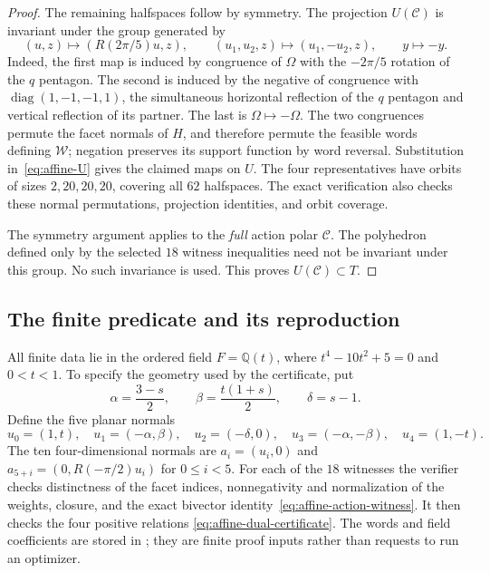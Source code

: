 \begin{proof}
The remaining halfspaces follow by symmetry. The projection
$U(\mathcal C)$ is invariant under the group generated by
\[
 (u,z)\longmapsto(R(2\pi/5)u,z),\qquad
 (u_1,u_2,z)\longmapsto(u_1,-u_2,z),\qquad
 y\longmapsto-y.
\]
Indeed, the first map is induced by congruence of $\Omega$ with the
$-2\pi/5$ rotation of the $q$ pentagon. The second is induced by the
negative of congruence with
$\operatorname{diag}(1,-1,-1,1)$, the simultaneous horizontal reflection
of the $q$ pentagon and vertical reflection of its partner. The last is
$\Omega\mapsto-\Omega$. The two congruences permute the facet normals
of $H$, and therefore permute the feasible words defining $\mathcal W$;
negation preserves its support function by word reversal. Substitution
in~\eqref{eq:affine-U} gives the claimed maps on $U$.
The four representatives have orbits of sizes $2,20,20,20$, covering all
$62$ halfspaces. The exact verification also checks these normal
permutations, projection identities, and orbit coverage.

The symmetry argument applies to the \emph{full} action polar
$\mathcal C$. The polyhedron defined only by the selected $18$ witness
inequalities need not be invariant under this group. No such invariance
is used. This proves $U(\mathcal C)\subset T$.
\end{proof}

\subsection{The finite predicate and its reproduction}
\label{subsec:affine-certificate}

All finite data lie in the ordered field
$F=\mathbb Q(t)$, where $t^4-10t^2+5=0$ and $0<t<1$. To specify the
geometry used by the certificate, put
\[
 \alpha=\frac{3-s}{2},\qquad \beta=\frac{t(1+s)}2,
 \qquad \delta=s-1.
\]
Define the five planar normals
\[
 u_0=(1,t),\quad u_1=(-\alpha,\beta),\quad u_2=(-\delta,0),\quad
 u_3=(-\alpha,-\beta),\quad u_4=(1,-t).
\]
The ten four-dimensional normals are
$a_i=(u_i,0)$ and $a_{5+i}=(0,R(-\pi/2)u_i)$ for $0\leq i<5$.
For each of the $18$ witnesses the verifier checks distinctness of the
facet indices, nonnegativity and normalization of the weights, closure,
and the exact bivector identity~\eqref{eq:affine-action-witness}.
It then checks the four positive relations
\eqref{eq:affine-dual-certificate}. The words and field coefficients are
stored in ; they are finite proof
inputs rather than requests to run an optimizer.

